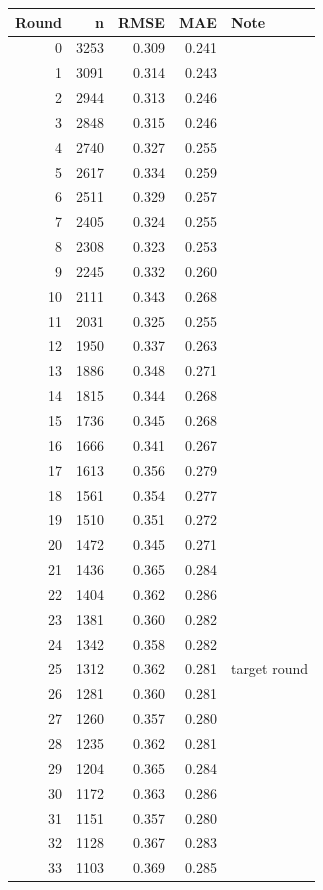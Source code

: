 \documentclass[11pt]{article}
\begin{document}
\bigskip
\begin{longtable}{rrrrl}
\toprule
\textbf{Round} & \textbf{n} & \textbf{RMSE} & \textbf{MAE} & \textbf{Note} \\
\midrule
\endhead
0  & 3253 & 0.309 & 0.241 & \\
1  & 3091 & 0.314 & 0.243 & \\
2  & 2944 & 0.313 & 0.246 & \\
3  & 2848 & 0.315 & 0.246 & \\
4  & 2740 & 0.327 & 0.255 & \\
5  & 2617 & 0.334 & 0.259 & \\
6  & 2511 & 0.329 & 0.257 & \\
7  & 2405 & 0.324 & 0.255 & \\
8  & 2308 & 0.323 & 0.253 & \\
9  & 2245 & 0.332 & 0.260 & \\
10 & 2111 & 0.343 & 0.268 & \\
11 & 2031 & 0.325 & 0.255 & \\
12 & 1950 & 0.337 & 0.263 & \\
13 & 1886 & 0.348 & 0.271 & \\
14 & 1815 & 0.344 & 0.268 & \\
15 & 1736 & 0.345 & 0.268 & \\
16 & 1666 & 0.341 & 0.267 & \\
17 & 1613 & 0.356 & 0.279 & \\
18 & 1561 & 0.354 & 0.277 & \\
19 & 1510 & 0.351 & 0.272 & \\
20 & 1472 & 0.345 & 0.271 & \\
21 & 1436 & 0.365 & 0.284 & \\
22 & 1404 & 0.362 & 0.286 & \\
23 & 1381 & 0.360 & 0.282 & \\
24 & 1342 & 0.358 & 0.282 & \\
25 & 1312 & 0.362 & 0.281 & target round \\
26 & 1281 & 0.360 & 0.281 & \\
27 & 1260 & 0.357 & 0.280 & \\
28 & 1235 & 0.362 & 0.281 & \\
29 & 1204 & 0.365 & 0.284 & \\
30 & 1172 & 0.363 & 0.286 & \\
31 & 1151 & 0.357 & 0.280 & \\
32 & 1128 & 0.367 & 0.283 & \\
33 & 1103 & 0.369 & 0.285 & \\

\end{longtable}
\end{document}
